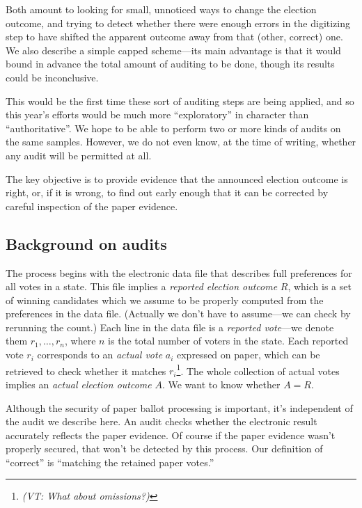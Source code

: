 \documentclass[10pt,a4paper]{article}
\newcommand{\VTNote}[1]{{\it(VT: #1)}}
\begin{document}
Both amount to looking for small, unnoticed ways to change the election outcome, and trying to detect whether there were enough errors in the digitizing step to have shifted the apparent outcome away from that (other, correct) one. We also describe a simple capped scheme---its main advantage is that it would bound in advance the total amount of auditing to be done, though its results could be inconclusive. 

This would be the first time these sort of auditing steps are
being applied, and so this year's efforts would be much more
``exploratory'' in character than ``authoritative''.  We hope to be able to perform two or more kinds of audits on the same samples.  However, we do not even know, at the time of writing, whether any audit will be permitted at all.  

The key objective is to provide evidence that the announced election outcome is right, or, if it is wrong, to find out early enough that it can be corrected by careful inspection of the paper evidence.

\subsection{Background on audits}
The process begins with the electronic data file that describes full preferences for all votes in a state.  This file implies a \emph{reported election outcome} $R$, which is a set of winning candidates which we assume to be properly computed from the preferences in the data file.  (Actually we don't have to assume---we can check by rerunning the count.)  Each line in the data file is a \emph{reported vote}---we denote them $r_1,\ldots,r_n$, where $n$ is the total number of voters in the state.  Each reported vote $r_i$ corresponds to an \emph{actual vote} $a_i$ expressed on paper, which can be retrieved to check whether it matches $r_i$\footnote{\VTNote{What about omissions?}}.   The whole collection of actual votes implies an \emph{actual election outcome} $A$.  We want to know whether $A = R$.

Although the security of paper ballot processing is important, it's independent of the audit we describe here.  An audit checks whether the electronic result accurately reflects the paper evidence.  Of course if the paper evidence wasn't properly secured, that won't be detected by this process.  Our definition of ``correct'' is ``matching the retained paper votes.''
\end{document}

